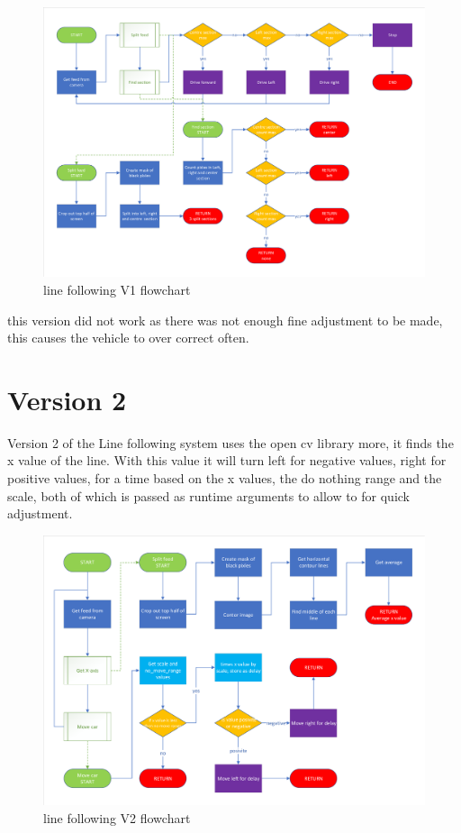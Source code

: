 \begin{figure}[h]%
	\centering
	\includegraphics[width = 1\textwidth]{"assets/line_following_V1_flowchart"}
	\caption{line following V1 flowchart}
	\label{fig:line_following_V1_flowchart}
\end{figure}

this version did not work as there was not enough fine adjustment to be made, this causes the vehicle to over correct often. 

	\section{Version 2}

Version 2 of the Line following system uses the open cv library more, it finds the x value of the line. With this value it will turn left for negative values, right for positive values, for a time based on the x values, the do nothing range and the scale, both of which is passed as runtime arguments to allow to for quick adjustment. 
		
\begin{figure}[h]%
	\centering
	\includegraphics[width = 1\textwidth]{"assets/line_following_V2_flowchart"}
	\caption{line following V2 flowchart}
	\label{fig:line_following_V2_flowchart}
\end{figure}

